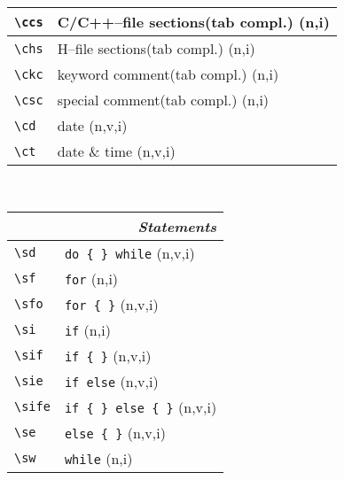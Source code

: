 \documentclass[oneside,11pt,landscape,DIV16]{scrartcl}
\begin{document}
\begin{multicols}{3}
\begin{center}
\begin{tabular}[]{|p{10mm}|p{60mm}|}
\hline \verb'\ccs'& C/C++--file sections\hspace{3mm}\footnotesize{(tab compl.)}    \hfill \normalsize{(n,i)}\\
\hline \verb'\chs'& H--file sections\hspace{10mm}\footnotesize{(tab compl.)}       \hfill \normalsize{(n,i)}\\
\hline \verb'\ckc'& keyword comment\hspace{5mm}\footnotesize{(tab compl.)}         \hfill \normalsize{(n,i)}\\
\hline \verb'\csc'& special comment\hspace{7,5mm}\footnotesize{(tab compl.)}       \hfill \normalsize{(n,i)}\\

\hline \verb'\cd' & date                                    \hfill (n,v,i)\\
\hline \verb'\ct' & date \& time                            \hfill (n,v,i)\\
\hline 
\end{tabular}\\
%
%
\begin{tabular}[]{|p{15mm}|p{55mm}|}
\hline
\multicolumn{2}{|r|}{\textsl{\textbf{S}tatements}} \\
\hline \verb'\sd'  & \verb'do { } while'        \hfill (n,v,i)\\
\hline \verb'\sf'  & \verb'for'                 \hfill (n,i)\\
\hline \verb'\sfo' & \verb'for { }'             \hfill (n,v,i)\\
\hline \verb'\si'  & \verb'if'                  \hfill (n,i)\\
\hline \verb'\sif' & \verb'if { }'              \hfill (n,v,i)\\
\hline \verb'\sie' & \verb'if else'             \hfill (n,v,i)\\
\hline \verb'\sife'& \verb'if { } else { }'     \hfill (n,v,i)\\
\hline \verb'\se'  & \verb'else { }'            \hfill (n,v,i)\\
\hline \verb'\sw'  & \verb'while'               \hfill (n,i)\\

\end{tabular}
\end{center}
\end{multicols}
\end{document}
